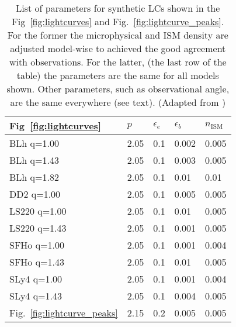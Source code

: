 \begin{table}
    \begin{center}
        \caption{
            List of parameters for synthetic \acp{LC} shown in the Fig~\ref{fig:lightcurves} 
            and Fig.~\ref{fig:lightcurve_peaks}.
            For the former the microphysical and \ac{ISM} density are adjusted model-wise 
            to achieved the good agreement with observations. For the latter,
            (the last row of the table) the parameters are the same for all models shown.
            Other parameters, such as observational angle, are the same everywhere (see text).
            (Adapted from \citet{Nedora:2021eoj})
        }
        \begin{tabular}{l | l l l l}
            Fig~\ref{fig:lightcurves} & $p$ & $\epsilon_e$ & $\epsilon_b$ & $n_{\text{ISM}}$ \\ \hline 
            BLh q=1.00    & 2.05 & 0.1          & 0.002        & 0.005            \\
            BLh q=1.43    & 2.05 & 0.1          & 0.003        & 0.005            \\
            BLh q=1.82    & 2.05 & 0.1          & 0.01         & 0.01             \\
            DD2 q=1.00    & 2.05 & 0.1          & 0.005        & 0.005            \\
            LS220 q=1.00  & 2.05 & 0.1          & 0.01         & 0.005            \\
            LS220 q=1.43  & 2.05 & 0.1          & 0.001        & 0.005            \\
            SFHo q=1.00   & 2.05 & 0.1          & 0.001        & 0.004            \\
            SFHo q=1.43   & 2.05 & 0.1          & 0.01         & 0.005            \\
            SLy4 q=1.00   & 2.05 & 0.1          & 0.001        & 0.004            \\
            SLy4 q=1.43   & 2.05 & 0.1          & 0.004        & 0.005            \\ \hline
            Fig.~\ref{fig:lightcurve_peaks}  & 2.15 & 0.2         & 0.005        & 0.005           
        \end{tabular}
    \end{center}
    \label{tab:pars}
\end{table}

